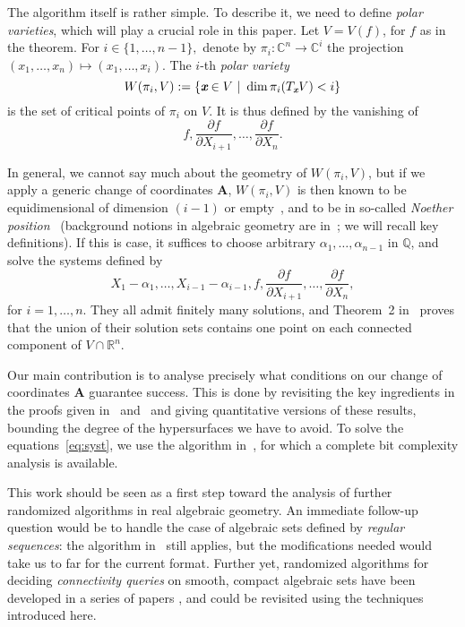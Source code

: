 \documentclass[sigconf]{acmart}
\def\mA{{\bm A}}
\def\xb{\textit{\textbf{x}}}
\def\C{\mathbb{C}}
\def\Q{\mathbb{Q}}
\def\R{\mathbb{R}}
\def\pa{\partial}
\begin{document}
The algorithm itself is rather simple. To describe it, we need to
define {\em polar varieties}, which will play a crucial role in this
paper. Let $V=V(f)$, for $f$ as in the theorem. For $i \in
\{1,\hdots,n-1\},$ denote by $\pi_i:\C^n \rightarrow \C^i$ the
projection $(x_1,\hdots,x_n) \mapsto (x_1,\hdots,x_i)$.  The $i$-th
\textit{polar variety} \[W(\pi_i,V) := \{\xb \in V~|~\dim \pi_i(T_\xb
V) < i\}\] is the set of critical points of $\pi_i$ on $V$.  It is
thus defined by the vanishing of \[f,\frac{\pa f}{\pa
  X_{i+1}},\hdots,\frac{\pa f}{\pa X_n}.\]

In general, we cannot say much about the geometry of
$W(\pi_i,V)$, but if we apply a generic change of coordinates $\mA$,
$W(\pi_i,V)$ is then known to be equidimensional of dimension $(i-1)$
or empty~\cite{BaGiHeMb97}, and to be in so-called {\em Noether
  position}~\cite{EMP} (background notions in algebraic geometry are
in~\cite{Mumford76,Shafarevich77,ECA}; we will recall key
definitions). If this is case, it suffices to choose arbitrary
$\alpha_1,\dots,\alpha_{n-1}$ in $\Q$, and solve the systems defined
by
\begin{equation}\label{eq:syst}
X_1-\alpha_1,\dots,X_{i-1}-\alpha_{i-1}, f, \frac{\pa f}{\pa
  X_{i+1}} ,\dots,\frac{\pa f}{\pa X_n},  
\end{equation}
for $i=1,\dots,n$.  They all admit finitely many solutions, and
Theorem~2 in~\cite{EMP} proves that the union of their solution sets
contains one point on each connected component of $V \cap \R^n$.

Our main contribution is to analyse precisely what conditions on our
change of coordinates $\mA$ guarantee success. This is done by
revisiting the key ingredients in the proofs given
in~\cite{BaGiHeMb97} and~\cite{EMP} and giving quantitative versions
of these results, bounding the degree of the hypersurfaces we have to
avoid.  To solve the equations~\eqref{eq:syst}, we use the algorithm
in~\cite{SH}, for which a complete bit complexity analysis is
available.

This work should be seen as a first step toward the analysis of
further randomized algorithms in real algebraic geometry. An immediate
follow-up question would be to handle the case of algebraic sets
defined by {\em regular sequences}: the algorithm in~\cite{EMP} still
applies, but the modifications needed would take us to far for the
current format. Further yet, randomized algorithms for deciding {\em
  connectivity queries} on smooth, compact algebraic sets have been
developed in a series of papers
\cite{SchostMohabBabySteps2011,SchostMohabBabySteps2014}, and could be
revisited using the techniques introduced here.
\end{document}
